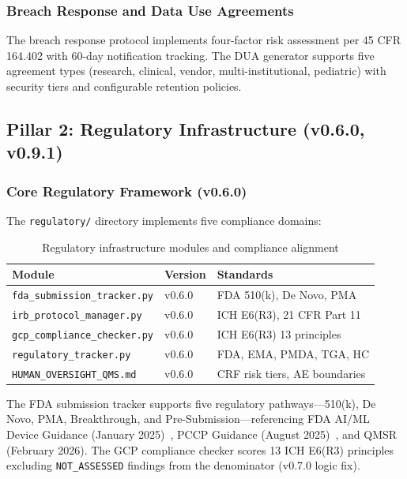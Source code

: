 \documentclass[10pt]{article}
\begin{document}
\subsubsection{Breach Response and Data Use Agreements}

The breach response protocol implements four-factor risk assessment per 45 CFR 164.402 with 60-day notification tracking. The DUA generator supports five agreement types (research, clinical, vendor, multi-institutional, pediatric) with security tiers and configurable retention policies.

\subsection{Pillar 2: Regulatory Infrastructure (v0.6.0, v0.9.1)}
\label{sec:regulatory}

\subsubsection{Core Regulatory Framework (v0.6.0)}

The \texttt{regulatory/} directory implements five compliance domains:

\begin{table}[H]
\centering
\caption{Regulatory infrastructure modules and compliance alignment}
\label{tab:regulatory}
\small
\begin{tabular}{@{}lll@{}}
\toprule
\textbf{Module} & \textbf{Version} & \textbf{Standards} \\
\midrule
\texttt{fda\_submission\_tracker.py} & v0.6.0 & FDA 510(k), De Novo, PMA \\
\texttt{irb\_protocol\_manager.py} & v0.6.0 & ICH E6(R3), 21 CFR Part 11 \\
\texttt{gcp\_compliance\_checker.py} & v0.6.0 & ICH E6(R3) 13 principles \\
\texttt{regulatory\_tracker.py} & v0.6.0 & FDA, EMA, PMDA, TGA, HC \\
\texttt{HUMAN\_OVERSIGHT\_QMS.md} & v0.6.0 & CRF risk tiers, AE boundaries \\
\bottomrule
\end{tabular}
\end{table}

The FDA submission tracker supports five regulatory pathways---510(k), De Novo, PMA, Breakthrough, and Pre-Submission---referencing FDA AI/ML Device Guidance (January 2025)~\cite{fda2025aiml}, PCCP Guidance (August 2025)~\cite{fda2025pccp}, and QMSR (February 2026). The GCP compliance checker scores 13 ICH E6(R3) principles~\cite{ich2025e6r3} excluding \texttt{NOT\_ASSESSED} findings from the denominator (v0.7.0 logic fix).
\end{document}
